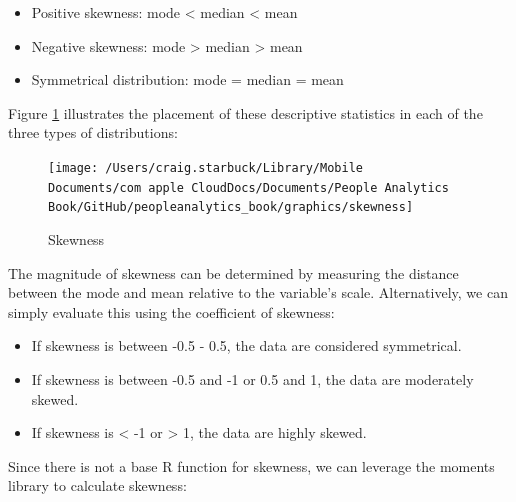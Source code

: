 \documentclass[
]{book}
\newenvironment{Shaded}{\begin{snugshade}}{\end{snugshade}}
\newcommand{\CommentTok}[1]{\textcolor[rgb]{0.56,0.35,0.01}{\textit{#1}}}
\newcommand{\DecValTok}[1]{\textcolor[rgb]{0.00,0.00,0.81}{#1}}
\newcommand{\FunctionTok}[1]{\textcolor[rgb]{0.00,0.00,0.00}{#1}}
\newcommand{\NormalTok}[1]{#1}
\newcommand{\SpecialCharTok}[1]{\textcolor[rgb]{0.00,0.00,0.00}{#1}}
\providecommand{\tightlist}{%
  \setlength{\itemsep}{0pt}\setlength{\parskip}{0pt}}
\begin{document}
\begin{itemize}
\tightlist
\item
  Positive skewness: mode \textless{} median \textless{} mean
\item
  Negative skewness: mode \textgreater{} median \textgreater{} mean
\item
  Symmetrical distribution: mode = median = mean
\end{itemize}

Figure \ref{fig:skewness} illustrates the placement of these descriptive statistics in each of the three types of distributions:

\begin{figure}

{\centering \texttt{[image: /Users/craig.starbuck/Library/Mobile Documents/com~apple~CloudDocs/Documents/People Analytics Book/GitHub/peopleanalytics\_book/graphics/skewness]} 

}

\caption{Skewness}\label{fig:skewness}
\end{figure}

The magnitude of skewness can be determined by measuring the distance between the mode and mean relative to the variable's scale. Alternatively, we can simply evaluate this using the coefficient of skewness:

\begin{itemize}
\tightlist
\item
  If skewness is between -0.5 - 0.5, the data are considered symmetrical.
\item
  If skewness is between -0.5 and -1 or 0.5 and 1, the data are moderately skewed.
\item
  If skewness is \textless{} -1 or \textgreater{} 1, the data are highly skewed.
\end{itemize}

Since there is not a base R function for skewness, we can leverage the moments library to calculate skewness:

\begin{Shaded}
\end{Shaded}
\end{document}
